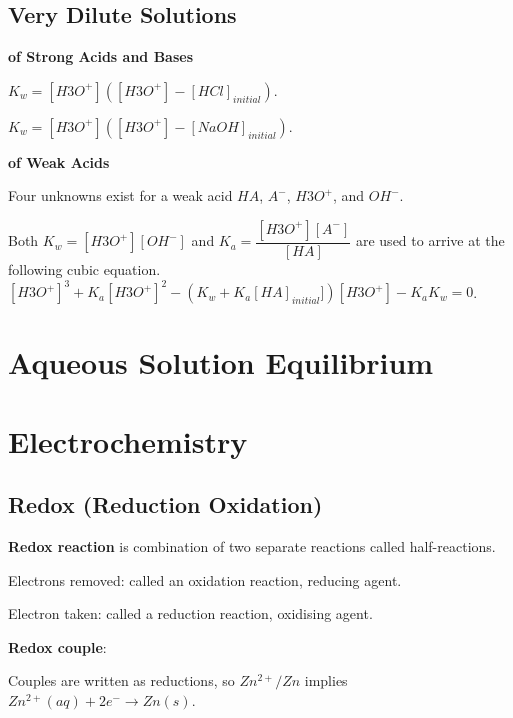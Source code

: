 \documentclass[a4paper,12pt]{article}
\begin{document}
\subsection{Very Dilute Solutions}
\textbf{of Strong Acids and Bases}\par
$K_{w} = [H3O^{+}] ([H3O^{+}] - [HCl]_{initial})$.\par
$K_{w} = [H3O^{+}] ([H3O^{+}] - [NaOH]_{initial})$.\par
\textbf{of Weak Acids}\par
Four unknowns exist for a weak acid $HA$, $A^{-}$, $H3O^{+}$, and $OH^{-}$.\par
Both $K_{w} = [H3O^{+}][OH^{-}]$ and $K_{a} = \dfrac{[H3O^{+}][A^{-}]}{[HA]}$ are used to arrive at the following cubic equation.
$[H3O^{+}]^{3} + K_{a}[H3O^{+}]^{2} - (K_{w} + K_{a}[HA]_{initial}])[H3O^{+}] - K_{a}K_{w} = 0$.






\newpage
\section{Aqueous Solution Equilibrium}



\newpage
\section{Electrochemistry}
\subsection{Redox (Reduction Oxidation)}
\textbf{Redox reaction} is combination of two separate reactions called half-reactions.\par
Electrons removed: called an oxidation reaction, reducing agent.\par
Electron taken: called a reduction reaction, oxidising agent.\par
\textbf{Redox couple}:\par 
Couples are written as reductions, so $Zn^{2+}/Zn$ implies $Zn^{2+}(aq)+2e^{-}\rightarrow Zn(s)$.\par
\end{document}

